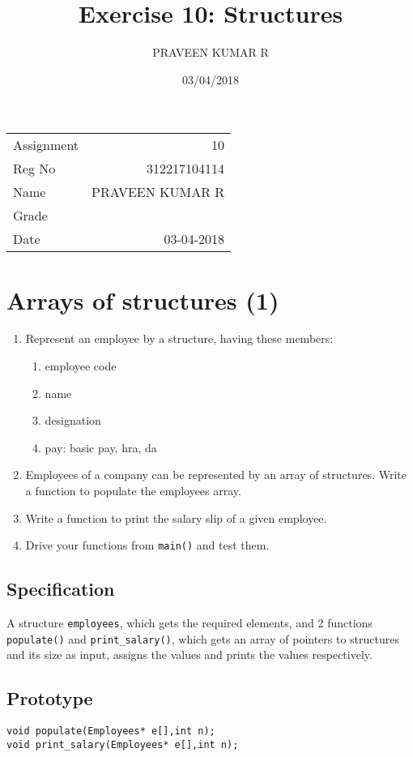 \documentclass[11pt]{article}
\author{PRAVEEN KUMAR R}
\date{03/04/2018}
\title{Exercise 10: Structures}
\begin{document}
\maketitle
\linespread{1.2}
\linespread{1.5}
\begin{center}
\begin{tabular}{lr}
Assignment & 10\\
Reg No & 312217104114\\
Name & PRAVEEN KUMAR R\\
Grade & \\
Date & 03-04-2018\\
\end{tabular}
\end{center}
\section{Arrays of structures (1)}
\label{sec-1}
\begin{enumerate}
\item Represent an employee by a structure, having these members:
\begin{enumerate}
\item employee code
\item name
\item designation
\item pay: basic pay, hra, da
\end{enumerate}
\item Employees of a company can be represented by an array of
structures. Write a function to populate the employees array.
\item Write a function to print the salary slip of a given employee.
\item Drive your functions from \texttt{main()} and test them.
\end{enumerate}
\subsection*{Specification}
\label{sec-1-1}
A structure \texttt{employees}, which gets the required elements, and 2
functions \texttt{populate()} and \texttt{print\_salary()}, which gets an array
of pointers to structures and its size as input, assigns the values
and prints the values respectively.
\subsection*{Prototype}
\label{sec-1-2}
\begin{verbatim}
void populate(Employees* e[],int n);
void print_salary(Employees* e[],int n);
\end{verbatim}
\end{document}
